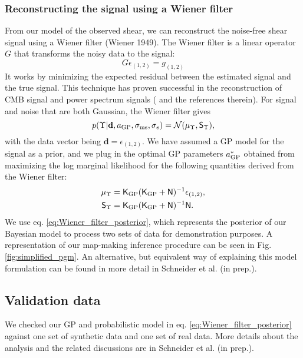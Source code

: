 \subsubsection{Reconstructing the signal using a Wiener filter}
From our model of the observed shear, 
we can reconstruct the noise-free shear signal using a Wiener filter (Wiener 1949). 
The Wiener filter is a linear operator $G$ that transforms the noisy
data to the signal:
\begin{equation}
	G\epsilon_{(1, 2)} = g_{(1, 2)}
\end{equation}
It works by minimizing the expected residual between the estimated signal and the true
signal. This technique has proven successful in the reconstruction of CMB signal
and power spectrum signals (\citealt{Elsner2013} and the references therein).
For signal and noise that are both Gaussian, the Wiener filter gives 
\begin{equation}
	p(\Upsilon| \mathbf{d}, a_{\rm GP}, \sigma_{\rm ms}, \sigma_e) = \mathcal{N}(\mu_\Upsilon,
	\mathsf{S}_\Upsilon),
	\label{eq:Wiener_filter_posterior}
\end{equation}
with the data vector being $\mathbf{d} = \epsilon_{(1, 2)}$. We have assumed 
a GP model for the signal as a prior, and we plug in the
optimal GP parameters $a_{\rm GP}^*$ obtained from maximizing the log marginal
likelihood for the following quantities derived from the Wiener filter:
\begin{align}
\mu_\Upsilon & = \mathsf{K}_{\rm GP}(\mathsf{K}_{\rm GP} + \mathsf{N})^{-1}
\epsilon_{(1, 2)}, \\
\mathsf{S}_\Upsilon & = \mathsf{K}_{\rm GP}(\mathsf{K}_{\rm GP} +
\mathsf{N})^{-1}\mathsf{N}.
\end{align}
We use eq. \ref{eq:Wiener_filter_posterior}, which represents the posterior
of our Bayesian model to process two sets of
data for demonstration purposes. A representation of our map-making inference procedure can be seen in Fig. 
\ref{fig:simplified_pgm}. An alternative, but equivalent way of explaining this
model formulation can be found in more detail in Schneider et al. (in prep.).

\subsection{Validation data}
We checked our GP and probabilistic model in eq. \ref{eq:Wiener_filter_posterior}
against one set of synthetic data and one set of real data.
More details about the analysis and the related discussions are in Schneider et 
al. (in prep.).

